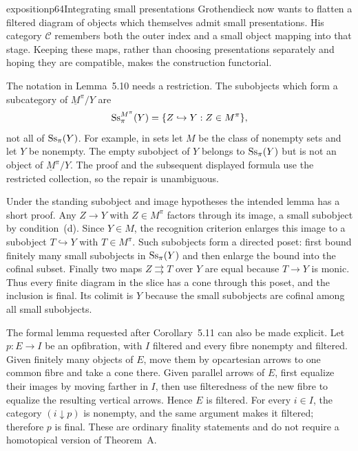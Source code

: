 \begin{dcomment}{exposition}{p64}{Integrating small presentations}
Grothendieck now wants to flatten a filtered diagram of objects which themselves admit small presentations. His category $\mathcal C$ remembers both the outer index and a small object mapping into that stage. Keeping these maps, rather than choosing presentations separately and hoping they are compatible, makes the construction functorial.

The notation in Lemma~5.10 needs a restriction. The subobjects which form a subcategory of $\underline M^\pi/Y$ are
\[
 \mathrm{Ss}_\pi^{M^\pi}(Y)=\{Z\hookrightarrow Y:Z\in M^\pi\},
\]
not all of $\mathrm{Ss}_\pi(Y)$. For example, in sets let $M$ be the class of nonempty sets and let $Y$ be nonempty. The empty subobject of $Y$ belongs to $\mathrm{Ss}_\pi(Y)$ but is not an object of $\underline M^\pi/Y$. The proof and the subsequent displayed formula use the restricted collection, so the repair is unambiguous.

Under the standing subobject and image hypotheses the intended lemma has a short proof. Any $Z\to Y$ with $Z\in M^\pi$ factors through its image, a small subobject by condition~(d). Since $Y\in M$, the recognition criterion enlarges this image to a subobject $T\hookrightarrow Y$ with $T\in M^\pi$. Such subobjects form a directed poset: first bound finitely many small subobjects in $\mathrm{Ss}_\pi(Y)$ and then enlarge the bound into the cofinal subset. Finally two maps $Z\rightrightarrows T$ over $Y$ are equal because $T\to Y$ is monic. Thus every finite diagram in the slice has a cone through this poset, and the inclusion is final. Its colimit is $Y$ because the small subobjects are cofinal among all small subobjects.

The formal lemma requested after Corollary~5.11 can also be made explicit. Let $p:E\to I$ be an opfibration, with $I$ filtered and every fibre nonempty and filtered. Given finitely many objects of $E$, move them by opcartesian arrows to one common fibre and take a cone there. Given parallel arrows of $E$, first equalize their images by moving farther in $I$, then use filteredness of the new fibre to equalize the resulting vertical arrows. Hence $E$ is filtered. For every $i\in I$, the category $(i\downarrow p)$ is nonempty, and the same argument makes it filtered; therefore $p$ is final. These are ordinary finality statements and do not require a homotopical version of Theorem~A.


\end{dcomment}
